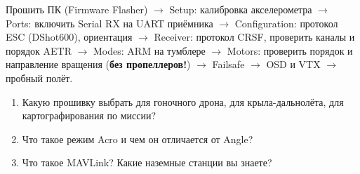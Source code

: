 \begin{keybox}
Прошить ПК (Firmware Flasher) $\to$ Setup: калибровка акселерометра $\to$ Ports: включить Serial RX на UART приёмника $\to$ Configuration: протокол ESC (DShot600), ориентация $\to$ Receiver: протокол CRSF, проверить каналы и порядок AETR $\to$ Modes: ARM на тумблере $\to$ Motors: проверить порядок и направление вращения (\textbf{без пропеллеров!}) $\to$ Failsafe $\to$ OSD и VTX $\to$ пробный полёт.
\end{keybox}

\begin{exam}
\begin{enumerate}
\item Какую прошивку выбрать для гоночного дрона, для крыла-дальнолёта, для картографирования по миссии?
\item Что такое режим Acro и чем он отличается от Angle?
\item Что такое MAVLink? Какие наземные станции вы знаете?
\end{enumerate}
\end{exam}
